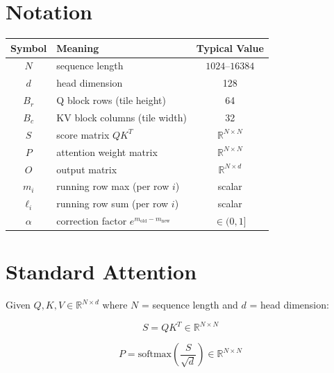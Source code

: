 \documentclass[11pt, letterpaper]{article}
\newcommand{\R}{\mathbb{R}}
\begin{document}
\section{Notation}

\begin{table}[h]
\centering
\begin{tabular}{@{}clc@{}}
\toprule
\textbf{Symbol} & \textbf{Meaning} & \textbf{Typical Value} \\
\midrule
$N$        & sequence length                    & $1024$--$16384$ \\
$d$        & head dimension                     & 128 \\
$B_r$      & Q block rows (tile height)         & 64 \\
$B_c$      & KV block columns (tile width)      & 32 \\
$S$        & score matrix $QK^T$                & $\R^{N \times N}$ \\
$P$        & attention weight matrix             & $\R^{N \times N}$ \\
$O$        & output matrix                      & $\R^{N \times d}$ \\
$m_i$      & running row max (per row $i$)       & scalar \\
$\ell_i$   & running row sum (per row $i$)       & scalar \\
$\alpha$   & correction factor $e^{m_{\text{old}} - m_{\text{new}}}$ & $\in (0, 1]$ \\
\bottomrule
\end{tabular}
\end{table}

\section{Standard Attention}

Given $Q, K, V \in \R^{N \times d}$ where $N$ = sequence length and $d$ = head dimension:

\begin{equation}
S = Q K^T \in \R^{N \times N}
\end{equation}

\begin{equation}
P = \text{softmax}\!\left(\frac{S}{\sqrt{d}}\right) \in \R^{N \times N}
\end{equation}
\end{document}
